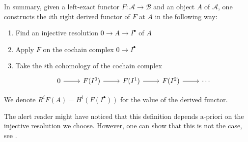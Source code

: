 In summary, given a left-exact functor $F:\mathcal{A}\to
\mathcal{B}$ and an object $A$ of $\mathcal{A}$, one constructs the $i$th
right derived functor of $F$ at $A$ in the following way:
\begin{enumerate}
  \item Find an injective resolution $0\to A\to I^{\bullet}$ of $A$
  \item Apply $F$ on the cochain complex $0\to I^{\bullet}$
  \item Take the $i$th cohomology of the cochain complex
        \[\begin{tikzcd}
            0\rar & F(I^{0})\rar & F(I^{1})\rar
            & F(I^{2})\rar & \cdots
          \end{tikzcd}\]
\end{enumerate}
We denote $R^{i}F(A)=H^{i}(F(I^{\bullet}))$ for the value of the
derived functor.
\begin{lwarn}
  The alert reader might have noticed that this definition depends a-priori
  on the injective resolution we choose. However, one can show that this is
  not the case, see \cite{vakil}.
\end{lwarn}
